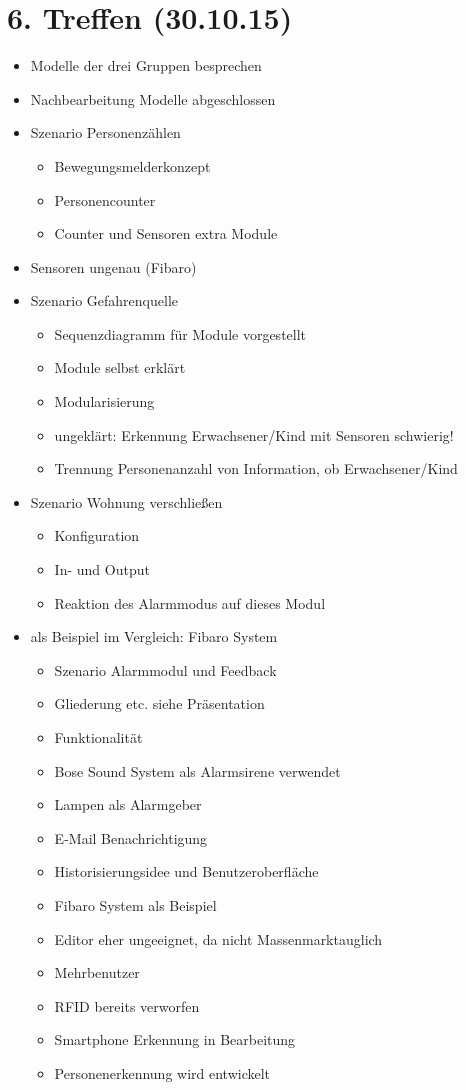 \section{6. Treffen (30.10.15)}
\begin{itemize}
	\item Modelle der drei Gruppen besprechen
	\item Nachbearbeitung Modelle abgeschlossen
	\item Szenario Personenzählen
	\begin{itemize}
		\item Bewegungsmelderkonzept
		\item Personencounter
		\item Counter und Sensoren extra Module
	\end{itemize}

	\item Sensoren ungenau (Fibaro)
	\item Szenario Gefahrenquelle
	\begin{itemize}
		\item Sequenzdiagramm für Module vorgestellt
		\item Module selbst erklärt
		\item Modularisierung
		\item ungeklärt: Erkennung Erwachsener/Kind mit Sensoren schwierig!
		\item Trennung Personenanzahl von Information, ob Erwachsener/Kind
	\end{itemize}

	\item Szenario Wohnung verschließen
	\begin{itemize}
		\item Konfiguration
		\item In- und Output
		\item Reaktion des Alarmmodus auf dieses Modul
	\end{itemize}

	\item als Beispiel im Vergleich: Fibaro System
	\begin{itemize}
		\item Szenario Alarmmodul und Feedback
		\item Gliederung etc. siehe Präsentation
		\item Funktionalität
		\item Bose Sound System als Alarmsirene verwendet
		\item Lampen als Alarmgeber
		\item E-Mail Benachrichtigung
		\item Historisierungsidee und Benutzeroberfläche
		\item Fibaro System als Beispiel
		\item Editor eher ungeeignet, da nicht Massenmarktauglich
		\item Mehrbenutzer
		\item RFID bereits verworfen
		\item Smartphone Erkennung in Bearbeitung
		\item Personenerkennung wird entwickelt
	\end{itemize}


\end{itemize}
